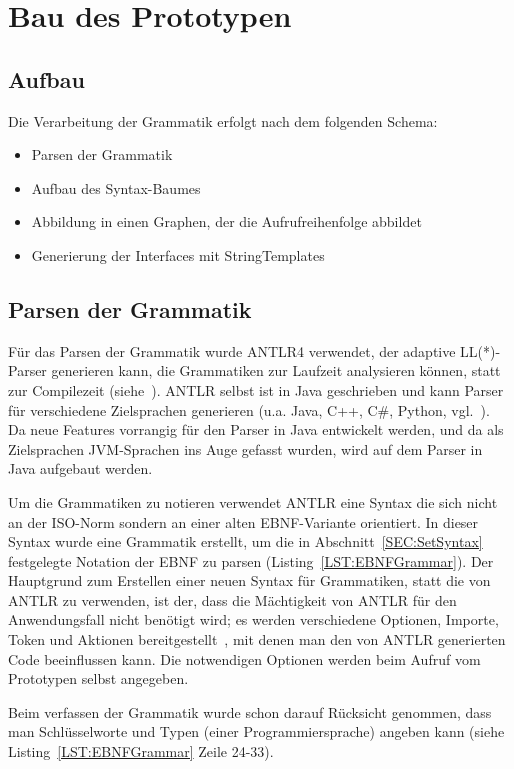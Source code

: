\documentclass[../InterneDSLs.tex]{subfiles}
\begin{document}
\chapter{Bau des Prototypen}\label{SEC:Prototype}

\section{Aufbau}
Die Verarbeitung der Grammatik erfolgt nach dem folgenden Schema:
\begin{itemize}
	\item Parsen der Grammatik
	\item Aufbau des Syntax-Baumes
	\item Abbildung in einen Graphen, der die Aufrufreihenfolge abbildet
	\item Generierung der Interfaces mit StringTemplates
\end{itemize}

\section{Parsen der Grammatik}
Für das Parsen der Grammatik wurde ANTLR4 verwendet, der adaptive LL(*)-Parser generieren kann, die Grammatiken zur Laufzeit analysieren können, statt zur Compilezeit (siehe~\cite[S. xiii ff]{Parr.2012}). ANTLR selbst ist in Java geschrieben und kann Parser für verschiedene Zielsprachen generieren (u.a. Java, C++, C\#, Python, vgl.~\cite{antlrcodegeneration.github}). Da neue Features vorrangig für den Parser in Java entwickelt werden, und da als Zielsprachen JVM-Sprachen ins Auge gefasst wurden, wird auf dem Parser in Java aufgebaut werden.

Um die Grammatiken zu notieren verwendet ANTLR eine Syntax die sich nicht an der ISO-Norm sondern an einer alten EBNF-Variante orientiert. In dieser Syntax wurde eine Grammatik erstellt, um die in Abschnitt~\ref{SEC:SetSyntax} festgelegte Notation der EBNF zu parsen (Listing~\ref{LST:EBNFGrammar}). Der Hauptgrund zum Erstellen einer neuen Syntax für Grammatiken, statt die von ANTLR zu verwenden, ist der, dass die Mächtigkeit von ANTLR für den Anwendungsfall nicht benötigt wird; es werden verschiedene Optionen, Importe, Token und Aktionen bereitgestellt~\cite[S. 265ff]{Parr.2012}, mit denen man den von ANTLR generierten Code beeinflussen kann. Die notwendigen Optionen werden beim Aufruf vom Prototypen selbst angegeben.

Beim verfassen der Grammatik wurde schon darauf Rücksicht genommen, dass man Schlüsselworte und Typen (einer Programmiersprache) angeben kann (siehe Listing~\ref{LST:EBNFGrammar} Zeile 24-33).
\end{document}
